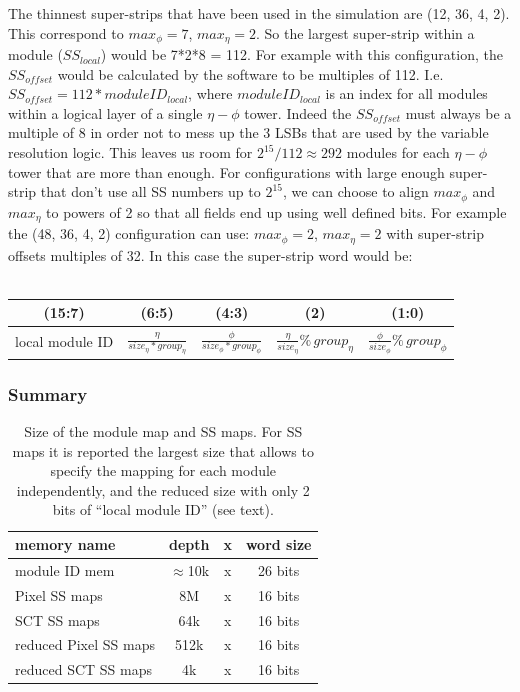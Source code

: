 \documentclass[10pt]{article}
\numberwithin{figure}{section}
\numberwithin{equation}{section}
\numberwithin{table}{section}
\newcommand{\0}{\phantom{0}}
\begin{document}
The thinnest super-strips that have been used in the simulation are (12, 36, 4, 2).
This correspond to $max_{\phi}=7$, $max_{\eta}=2$. So the largest super-strip within a module ($SS_{local}$) would be 7*2*8 = 112.
For example with this configuration, the $SS_{offset}$ would be calculated by the software to be multiples of 112. I.e. $SS_{offset}=112*moduleID_{local}$, where $moduleID_{local}$ is an index for all modules within a logical layer of a single $\eta-\phi$ tower.
Indeed the $SS_{offset}$ must always be a multiple of 8 in order not to mess up the 3 LSBs that are used by the variable resolution logic.
This leaves us room for $2^{15} / 112 \approx 292$ modules for each $\eta-\phi$ tower that are more than enough.
For configurations with large enough super-strip that don't use all SS numbers up to $2^{15}$, we can choose to align $max_{\phi}$ and $max_{\eta}$ to powers of 2 so that all fields end up using well defined bits.
For example the (48, 36, 4, 2) configuration can use:
$ max_{\phi} = 2 $, $max_{\eta} = 2 $ with super-strip offsets multiples of 32. In this case the super-strip word would be: \\
 \\
\begin{tabular}{c|c|c|c|c}
(15:7) & (6:5) & (4:3) & (2) & (1:0) \\ \hline
local module ID & $\frac{\eta}{size_{\eta}*group_{\eta}}$ & $\frac{\phi}{size_{\phi}*group_{\phi}}$ & $\frac{\eta}{size_{\eta}} \% \, group_{\eta}$ & $\frac{\phi}{size_{\phi}} \% \, group_{\phi}$ \\
\end{tabular}

\subsubsection{Summary}
\begin{table}[h]
\begin{tabular}{l|ccc}
memory name & depth & x & word size \\ \hline
module ID mem & $\approx$10k & x & 26 bits \\
Pixel SS maps & 8M & x & 16 bits \\
SCT SS maps & 64k & x & 16 bits \\
reduced Pixel SS maps & 512k & x & 16 bits \\
reduced SCT SS maps & 4k & x & 16 bits \\
\end{tabular}
\caption{\label{tab:SSmaps}Size of the module map and SS maps. For SS maps it is reported the largest size that allows to specify the mapping for each module independently, and the reduced size with only 2 bits of ``local module ID'' (see text).}
\end{table}
\end{document}

